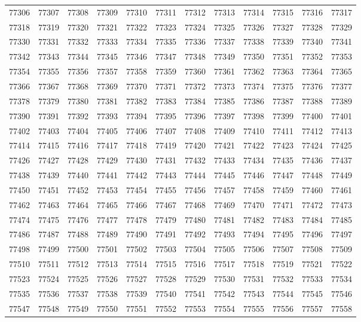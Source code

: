 \begin{center}
\begin{longtable}{llllllllllll}
77306 &77307 &77308 &77309 &77310 &77311 &77312 &77313 &77314 &77315 &77316 &77317 \\
77318 &77319 &77320 &77321 &77322 &77323 &77324 &77325 &77326 &77327 &77328 &77329 \\
77330 &77331 &77332 &77333 &77334 &77335 &77336 &77337 &77338 &77339 &77340 &77341 \\
77342 &77343 &77344 &77345 &77346 &77347 &77348 &77349 &77350 &77351 &77352 &77353 \\
77354 &77355 &77356 &77357 &77358 &77359 &77360 &77361 &77362 &77363 &77364 &77365 \\
77366 &77367 &77368 &77369 &77370 &77371 &77372 &77373 &77374 &77375 &77376 &77377 \\
77378 &77379 &77380 &77381 &77382 &77383 &77384 &77385 &77386 &77387 &77388 &77389 \\
77390 &77391 &77392 &77393 &77394 &77395 &77396 &77397 &77398 &77399 &77400 &77401 \\
77402 &77403 &77404 &77405 &77406 &77407 &77408 &77409 &77410 &77411 &77412 &77413 \\
77414 &77415 &77416 &77417 &77418 &77419 &77420 &77421 &77422 &77423 &77424 &77425 \\
77426 &77427 &77428 &77429 &77430 &77431 &77432 &77433 &77434 &77435 &77436 &77437 \\
77438 &77439 &77440 &77441 &77442 &77443 &77444 &77445 &77446 &77447 &77448 &77449 \\
77450 &77451 &77452 &77453 &77454 &77455 &77456 &77457 &77458 &77459 &77460 &77461 \\
77462 &77463 &77464 &77465 &77466 &77467 &77468 &77469 &77470 &77471 &77472 &77473 \\
77474 &77475 &77476 &77477 &77478 &77479 &77480 &77481 &77482 &77483 &77484 &77485 \\
77486 &77487 &77488 &77489 &77490 &77491 &77492 &77493 &77494 &77495 &77496 &77497 \\
77498 &77499 &77500 &77501 &77502 &77503 &77504 &77505 &77506 &77507 &77508 &77509 \\
77510 &77511 &77512 &77513 &77514 &77515 &77516 &77517 &77518 &77519 &77521 &77522 \\
77523 &77524 &77525 &77526 &77527 &77528 &77529 &77530 &77531 &77532 &77533 &77534 \\
77535 &77536 &77537 &77538 &77539 &77540 &77541 &77542 &77543 &77544 &77545 &77546 \\
77547 &77548 &77549 &77550 &77551 &77552 &77553 &77554 &77555 &77556 &77557 &77558 \\

\end{longtable}
\end{center}
